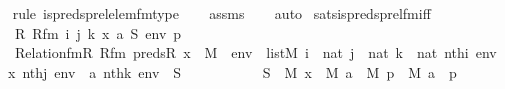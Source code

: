 \begin{isabellebody}
\ \ \isamarkupfalse%
{\isacharparenleft}{\kern0pt}rule\ is{\isacharunderscore}{\kern0pt}preds{\isacharunderscore}{\kern0pt}prel{\isacharunderscore}{\kern0pt}elem{\isacharunderscore}{\kern0pt}fm{\isacharunderscore}{\kern0pt}type{\isacharparenright}{\kern0pt}\isanewline
\ \ \isamarkupfalse%
\ assms\isanewline
\ \ \isamarkupfalse%
\ auto%
\endisatagproof
{\isafoldproof}%
%
\isadelimproof
\isanewline
%
\endisadelimproof
\isanewline
{}\isamarkupfalse%
\ sats{\isacharunderscore}{\kern0pt}is{\isacharunderscore}{\kern0pt}preds{\isacharunderscore}{\kern0pt}prel{\isacharunderscore}{\kern0pt}fm{\isacharunderscore}{\kern0pt}iff\ {\isacharcolon}{\kern0pt}\ \isanewline
\ \ \ R\ Rfm\ i\ j\ k\ x\ a\ S\ env\ p\isanewline
\ \ \ {\isachardoublequoteopen}Relation{\isacharunderscore}{\kern0pt}fm{\isacharparenleft}{\kern0pt}R{\isacharcomma}{\kern0pt}\ Rfm{\isacharparenright}{\kern0pt}{\isachardoublequoteclose}\ {\isachardoublequoteopen}preds{\isacharparenleft}{\kern0pt}R{\isacharcomma}{\kern0pt}\ x{\isacharparenright}{\kern0pt}\ {\isasymin}\ M{\isachardoublequoteclose}\ \ {\isachardoublequoteopen}env\ {\isasymin}\ list{\isacharparenleft}{\kern0pt}M{\isacharparenright}{\kern0pt}{\isachardoublequoteclose}\ {\isachardoublequoteopen}i\ {\isasymin}\ nat{\isachardoublequoteclose}\ {\isachardoublequoteopen}j\ {\isasymin}\ nat{\isachardoublequoteclose}\ {\isachardoublequoteopen}k\ {\isasymin}\ nat{\isachardoublequoteclose}\ {\isachardoublequoteopen}nth{\isacharparenleft}{\kern0pt}i{\isacharcomma}{\kern0pt}\ env{\isacharparenright}{\kern0pt}\ {\isacharequal}{\kern0pt}\ x{\isachardoublequoteclose}\ {\isachardoublequoteopen}nth{\isacharparenleft}{\kern0pt}j{\isacharcomma}{\kern0pt}\ env{\isacharparenright}{\kern0pt}\ {\isacharequal}{\kern0pt}\ a{\isachardoublequoteclose}\ {\isachardoublequoteopen}nth{\isacharparenleft}{\kern0pt}k{\isacharcomma}{\kern0pt}\ env{\isacharparenright}{\kern0pt}\ {\isacharequal}{\kern0pt}\ S{\isachardoublequoteclose}\ \isanewline
\ \ \ \ \ \ \ \ \ \ {\isachardoublequoteopen}S\ {\isasymin}\ M{\isachardoublequoteclose}\ {\isachardoublequoteopen}x\ {\isasymin}\ M{\isachardoublequoteclose}\ {\isachardoublequoteopen}a\ {\isasymin}\ M{\isachardoublequoteclose}\ {\isachardoublequoteopen}p\ {\isasymin}\ M{\isachardoublequoteclose}\ {\isachardoublequoteopen}a\ {\isasymin}\ p{\isachardoublequoteclose}\ \isanewline

\end{isabellebody}
